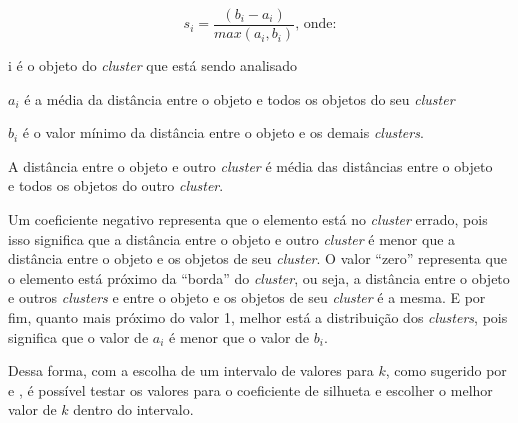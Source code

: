 \begin{apendicesenv}
\begin{equation} \label{eq:coeficiente}
  s_{i} = \frac{(b_{i} - a_{i})}{max(a_{i}, b_{i})} \mbox{, onde:}
\end{equation}

{\addtolength{\leftskip}{8mm}
    i é o objeto do \textit{cluster} que está sendo analisado
    
    $a_{i}$ é a média da distância entre o objeto e todos os objetos do seu \textit{cluster}
    
    $b_{i}$ é o valor mínimo da distância entre o objeto e os demais \textit{clusters}. 
    
	  \footnotesize \indent \indent A distância entre o objeto e outro \textit{cluster} é média das distâncias entre o objeto \\ \indent \indent e todos os objetos do outro \textit{cluster}.
}

Um coeficiente negativo representa que o elemento está no \textit{cluster} errado, pois isso significa que a distância entre o objeto e outro \textit{cluster} 
é menor que a distância entre o objeto e os objetos de seu \textit{cluster}. O valor ``zero'' representa que o elemento está próximo da ``borda'' do \textit{cluster}, ou seja,
a distância entre o objeto e outros \textit{clusters} e entre o objeto e os objetos de seu \textit{cluster} é a mesma. E por fim, quanto mais próximo do valor 1, melhor
está a distribuição dos \textit{clusters}, pois significa que o valor de $a_i$ é menor que o valor de $b_i$.

Dessa forma, com a escolha de um intervalo de valores para $k$, como sugerido por  e , é possível testar os valores 
para o coeficiente de silhueta e escolher o melhor valor de $k$ dentro do intervalo. 


\end{apendicesenv}
